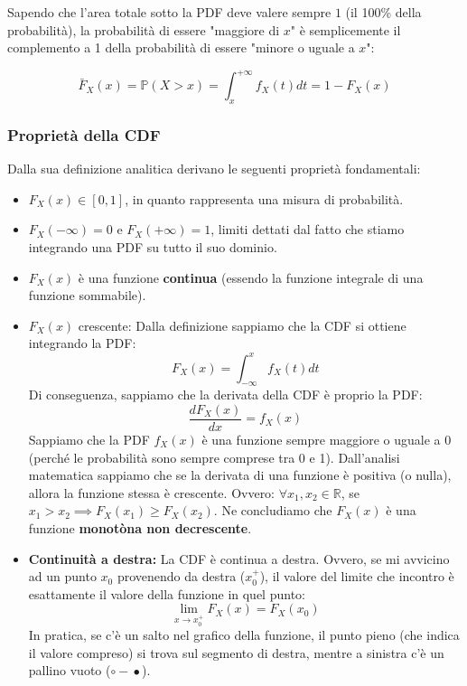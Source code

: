 Sapendo che l'area totale sotto la PDF deve valere sempre $1$ (il 100\% della probabilità), la probabilità di essere "maggiore di $x$" è semplicemente il complemento a 1 della probabilità di essere "minore o uguale a $x$":

\begin{equation}
\bar{F}_X(x) = \mathbb{P}(X > x) = \int_{x}^{+\infty} f_X(t) dt = 1 - F_X(x)
\end{equation}

\subsubsection{Proprietà della CDF}
Dalla sua definizione analitica derivano le seguenti proprietà fondamentali:
\begin{itemize}
    \item $F_X(x) \in [0, 1]$, in quanto rappresenta una misura di probabilità.
    \item $F_X(-\infty) = 0$ e $F_X(+\infty) = 1$, limiti dettati dal fatto che stiamo integrando una PDF su tutto il suo dominio.
    \item $F_X(x)$ è una funzione \textbf{continua} (essendo la funzione integrale di una funzione sommabile).
    \item $F_X(x)$ crescente: Dalla definizione sappiamo che la CDF si ottiene integrando la PDF:
    \[ F_X(x) = \int_{-\infty}^{x} f_X(t) dt \]
    Di conseguenza, sappiamo che la derivata della CDF è proprio la PDF:
    \[ \frac{d F_X(x)}{dx} = f_X(x) \]
    Sappiamo che la PDF $f_X(x)$ è una funzione sempre maggiore o uguale a 0 (perché le probabilità sono sempre comprese tra 0 e 1). Dall'analisi matematica sappiamo che se la derivata di una funzione è positiva (o nulla), allora la funzione stessa è crescente. 
    Ovvero: $\forall x_1, x_2 \in \mathbb{R}$, se $x_1 > x_2 \implies F_X(x_1) \ge F_X(x_2)$.
    Ne concludiamo che $F_X(x)$ è una funzione \textbf{monotòna non decrescente}.
    
    \item \textbf{Continuità a destra:} La CDF è continua a destra. Ovvero, se mi avvicino ad un punto $x_0$ provenendo da destra ($x_0^+$), il valore del limite che incontro è esattamente il valore della funzione in quel punto:
    \[ \lim_{x \to x_0^+} F_X(x) = F_X(x_0) \]
    In pratica, se c'è un salto nel grafico della funzione, il punto pieno (che indica il valore compreso) si trova sul segmento di destra, mentre a sinistra c'è un pallino vuoto ($\circ \!\!-\!\! \bullet$).
\end{itemize}

